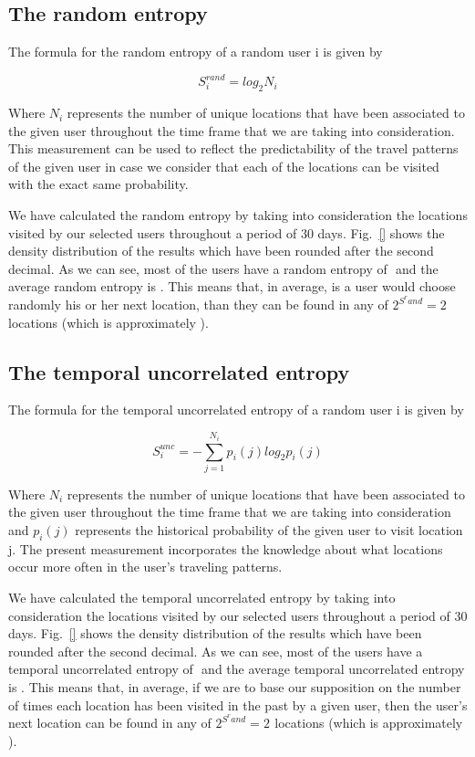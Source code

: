 \subsection{The random entropy}
\label{r_e}

The formula for the random entropy of a random user i is given by

\begin{equation}
S_{i}^{rand} = log_{2}N_{i}
\end{equation}

Where $N_{i}$ represents the number of unique locations that
have been associated to the given user throughout the time frame that we are
taking into consideration. This measurement can be used to reflect the
predictability of the travel patterns of the given user in case we consider that
each of the locations can be visited with the exact same probability.

We have calculated the random entropy by taking into consideration the locations
visited by our selected users throughout a period of $30$ days. Fig.~\ref{}
shows the density distribution of the results which have been rounded after the
second decimal. As we can see, most of the users have a random entropy of $ $
and the average random entropy is $ $. This means that, in average, is a user
would choose randomly his or her next location, than they can be found in any of
$2^{S^rand} = 2^{}$ locations (which is approximately $ $).


\subsection{The temporal uncorrelated entropy}
\label{tu_e}

The formula for the temporal uncorrelated entropy of a random user i is given by

\begin{equation}
S_{i}^{unc} = -\sum\limits_{j=1}^{N_{i}}p_{i}(j)log_{2}p_{i}(j)
\end{equation}

Where $N_{i}$ represents the number of unique locations that have been
associated to the given user throughout the time frame that we are taking into
consideration and $p_{i}(j)$ represents the historical probability of the given
user to visit location j. The present measurement incorporates the knowledge
about what locations occur more often in the user's traveling patterns.

We have calculated the temporal uncorrelated entropy by taking into
consideration the locations visited by our selected users throughout a period of
$30$ days. Fig.~\ref{} shows the density distribution of the results which have
been rounded after the second decimal. As we can see, most of the users have a
temporal uncorrelated entropy of $ $ and the average temporal uncorrelated
entropy is $ $. This means that, in average, if we are to base our supposition
on the number of times each location has been visited in the past by a given
user, then the user's next location can be found in any of $2^{S^rand} = 2^{}$
locations (which is approximately $ $).

